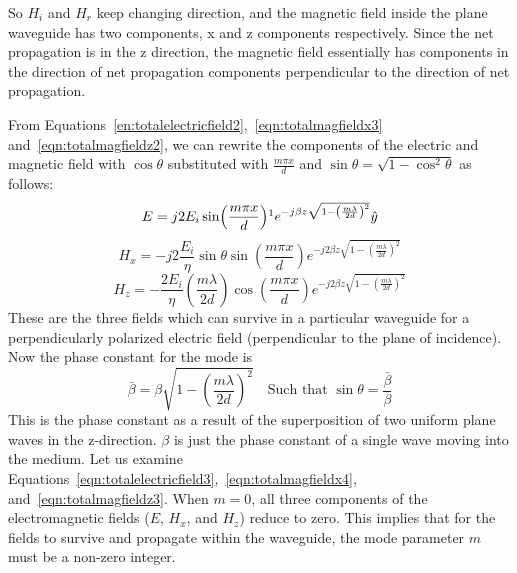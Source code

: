 So $H_i$ and $H_r$ keep changing direction, and the magnetic field inside the plane waveguide has two components, x and z components respectively. Since the net propagation is in the z direction, the magnetic field essentially has components in the direction of net propagation components perpendicular to the direction of net propagation.

From Equations~\eqref{en:totalelectricfield2},~\eqref{eqn:totalmagfieldx3} and~\eqref{eqn:totalmagfieldz2}, we can rewrite the components of the electric and magnetic field with $\cos\theta$ substituted with $\frac{m\pi x}{d}$ and $\sin\theta = \sqrt{1 - \cos^2\theta}$ as follows:
\begin{dmath}
E=j 2 E_i \sin(\frac{m\pi x}{d})\footnotemark e^{-j\beta z\sqrt{1 - \left(\frac{m\lambda}{2d}\right)^2}} \hat{y}
\label{eqn:totalelectricfield3}
\end{dmath}
\begin{dmath}
H_x = -j 2\frac{E_i}{\eta}\sin\theta\sin(\frac{m\pi x}{d}) e^{-j 2\beta z\sqrt{1 - \left(\frac{m\lambda}{2d}\right)^2}}
\label{eqn:totalmagfieldx4}
\end{dmath}
\begin{dmath}
H_z = -\frac{2E_i}{\eta}\left(\frac{m\lambda}{2d}\right)\cos(\frac{m\pi x}{d})e^{-j 2\beta z\sqrt{1 - \left(\frac{m\lambda}{2d}\right)^2}}
\label{eqn:totalmagfieldz3}
\end{dmath}
These are the three fields which can survive in a particular waveguide for a perpendicularly polarized electric field (perpendicular to the plane of incidence). Now the phase constant for the mode is
\begin{dmath}
\bar{\beta} = \beta\sqrt{1 - \left(\frac{m\lambda}{2d}\right)^2}\quad\text{Such that $\sin\theta
=\frac{\bar{\beta}}{\beta}$}
\label{eqn:phaseconst}
\end{dmath}
This is the phase constant as a result of the superposition of two uniform plane waves in the z-direction. $\beta$ is just the phase constant of a single wave moving into the medium. Let us examine Equations~\eqref{eqn:totalelectricfield3},~\eqref{eqn:totalmagfieldx4}, and~\eqref{eqn:totalmagfieldz3}. When $m=0$, all three components of the electromagnetic fields ($E$, $H_x$, and $H_z$) reduce to zero. This implies that for the fields to survive and propagate within the waveguide, the mode parameter $m$ must be a non-zero integer.

